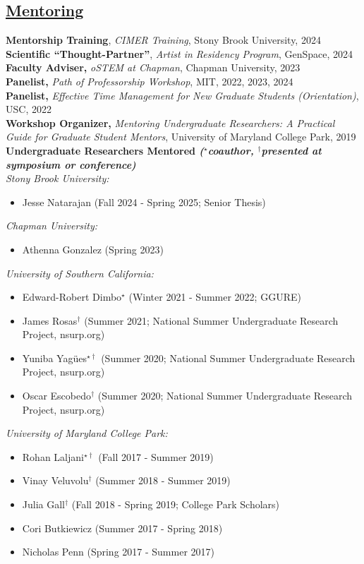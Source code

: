 \documentclass[]{res}
\begin{document}
\begin{resume}
\section{\underline{Mentoring}} \vspace{2mm}
{\bf Mentorship Training}, \emph{CIMER Training}, Stony Brook University, 2024\\
{\bf Scientific ``Thought-Partner''}, \emph{Artist in Residency Program}, GenSpace, 2024\\
{\bf Faculty Adviser,} \emph{oSTEM at Chapman}, Chapman University, 2023\\
{\bf Panelist,} \emph{Path of Professorship Workshop}, MIT, 2022, 2023, 2024\\
{\bf Panelist,} \emph{Effective Time Management for New Graduate Students (Orientation)}, USC, 2022\\
{\bf Workshop Organizer,} \emph{Mentoring Undergraduate Researchers: A Practical Guide for Graduate Student Mentors}, University of Maryland College Park, 2019\\
{\bf Undergraduate Researchers Mentored \emph{\footnotesize{($^{\star}$coauthor, $^{\dagger}$presented at symposium or conference)}}} \\
\emph{Stony Brook University:}
\begin{itemize}[leftmargin=*]
\item[] Jesse Natarajan (Fall 2024 - Spring 2025; Senior Thesis)
\end{itemize}
\emph{Chapman University:}
\begin{itemize}[leftmargin=*]
\item[] Athenna Gonzalez (Spring 2023)
\end{itemize}
\emph{University of Southern California:}
\begin{itemize}[leftmargin=*]
\item[] Edward-Robert Dimbo$^{\star}$ (Winter 2021 - Summer 2022; GGURE)
\item[] James Rosas$^{\dagger}$ (Summer 2021; National Summer Undergraduate Research Project, nsurp.org)
\item[] Yuniba Yag{\"u}es$^{\star\dagger}$ (Summer 2020; National Summer Undergraduate Research Project, nsurp.org)
\item[] Oscar Escobedo$^{\dagger}$ (Summer 2020; National Summer Undergraduate Research Project, nsurp.org)
\end{itemize}
\vspace{1mm}
\emph{University of Maryland College Park:}
\begin{itemize}[leftmargin=*]
\item[] Rohan Laljani$^{\star\dagger}$ (Fall 2017 - Summer 2019)
\item[] Vinay Veluvolu$^{\dagger}$ (Summer 2018 - Summer 2019)
\item[] Julia Gall$^{\dagger}$ (Fall 2018 - Spring 2019; College Park Scholars)
\item[] Cori Butkiewicz (Summer 2017 - Spring 2018)
\item[] Nicholas Penn (Spring 2017 - Summer 2017)
\end{itemize}



\end{resume}
\end{document}
